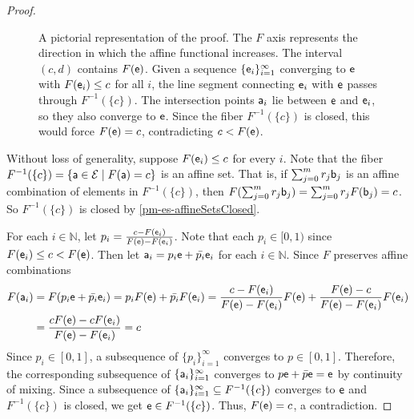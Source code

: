 \begin{mathSection}
\begin{proof}
\begin{figure}[H]
			\caption{A pictorial representation of the proof. The $F$ axis represents the direction in which the affine functional increases. The interval $(c,d)$ contains $F(\ens[e])$. Given a sequence $\{\ens_i\}_{i=1}^\infty$ converging to $\ens[e]$ with $F(\ens[e]_i) \le c$ for all $i$, the line segment connecting $\ens[e]_i$ with $\ens[e]$ passes through $F^{-1}(\{c\})$. The intersection points $\ens[a]_i$ lie between $\ens[e]$ and $\ens[e]_i$, so they also converge to $\ens[e]$. Since the fiber $F^{-1}(\{c\})$ is closed, this would force $F(\ens[e])=c$, contradicting $c<F(\ens[e])$.}
		\end{figure}
		
		Without loss of generality, suppose $F(\ens[e]_i) \le c$ for every $i$. Note that the fiber $F^{-1}(\{c\}) = \{\ens[a] \in \Ens \mid F(\ens[a]) = c\}$ is an affine set. That is, if $\sum_{j=0}^mr_j\ens[b]_j$ is an affine combination of elements in $F^{-1}(\{c\})$, then $F(\sum_{j=0}^mr_j\ens[b]_j) = \sum_{j=0}^mr_jF(\ens[b]_j) = c$. So $F^{-1}(\{c\})$ is closed by \ref{pm-es-affineSetsClosed}.
		
		For each $i \in \mathbb{N}$, let $p_i = \frac{c - F(\ens[e]_i)}{F(\ens[e]) - F(\ens[e]_i)}$. Note that each $p_i \in [0,1)$ since $F(\ens[e]_i) \le c < F(\ens[e])$. Then let $\ens[a]_i = p_i\ens[e] + \bar{p_i}\ens[e]_i$ for each $i \in \mathbb{N}$. Since $F$ preserves affine combinations
		\begin{equation}
			\begin{aligned}
				F(\ens[a]_i) &= F(p_i\ens[e] + \bar{p_i}\ens[e]_i) = p_iF(\ens[e]) + \bar{p_i}F(\ens[e]_i) = \frac{c - F(\ens[e]_i)}{F(\ens[e]) - F(\ens[e]_i)} F(\ens[e]) + \frac{F(\ens[e]) - c}{F(\ens[e]) - F(\ens[e]_i)} F(\ens[e]_i) \\ 
				&= \frac{cF(\ens[e]) - cF(\ens[e]_i)}{F(\ens[e]) - F(\ens[e]_i)} = c
			\end{aligned}
		\end{equation}
		Since $p_i \in [0,1]$, a subsequence of $\{p_i\}_{i=1}^\infty$ converges to $p \in [0,1]$. Therefore, the corresponding subsequence of $\{\ens[a]_i\}_{i=1}^\infty$ converges to $p\ens[e] + \bar{p}\ens[e] = \ens[e]$ by continuity of mixing. Since a subsequence of $\{\ens[a]_i\}_{i=1}^\infty \subseteq F^{-1}(\{c\})$ converges to $\ens[e]$ and $F^{-1}(\{c\})$ is closed, we get $\ens[e] \in F^{-1}(\{c\})$. Thus, $F(\ens[e]) = c$, a contradiction.
	\end{proof}
\end{mathSection}

